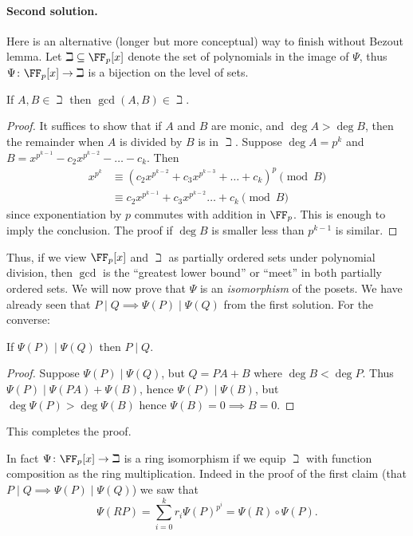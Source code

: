 \paragraph{Second solution.}
Here is an alternative (longer but more conceptual) way to finish without Bezout lemma.
Let $\beth \subseteq \FF_p[x]$ denote the set of polynomials in the image of $\Psi$,
thus $\Psi \colon \FF_p[x] \to \beth$ is a bijection on the level of sets.

\begin{claim*}
  If $A,B \in \beth$ then $\gcd(A,B) \in \beth$.
\end{claim*}
\begin{proof}
  It suffices to show that if $A$ and $B$ are monic,
  and $\deg A > \deg B$,
  then the remainder when $A$ is divided by $B$ is in $\beth$.
  Suppose $\deg A = p^k$ and $B = x^{p^{k-1}} - c_2x^{p^{k-2}} - \dots - c_k$.
  Then
  \begin{align*}
    x^{p^k} &\equiv \left( c_2x^{p^{k-2}} + c_3x^{p^{k-3}}
    + \dots + c_k  \right)^p \pmod B  \\
    &\equiv c_2x^{p^{k-1}} + c_3x^{p^{k-2}} \dots + c_k \pmod B
  \end{align*}
  since exponentiation by $p$ commutes with addition in $\FF_p$.
  This is enough to imply the conclusion.
  The proof if $\deg B$ is smaller less than $p^{k-1}$ is similar.
\end{proof}

Thus, if we view $\FF_p[x]$ and $\beth$ as partially ordered sets
under polynomial division, then $\gcd$ is the
``greatest lower bound'' or ``meet'' in both partially ordered sets.
We will now prove that $\Psi$ is an \emph{isomorphism} of the posets.
We have already seen that $P \mid Q \implies \Psi(P) \mid \Psi(Q)$
from the first solution. For the converse:

\begin{claim*}
  If $\Psi(P) \mid \Psi(Q)$ then $P \mid Q$.
\end{claim*}
\begin{proof}
  Suppose $\Psi(P) \mid \Psi(Q)$, but $Q=PA+B$ where $\deg B < \deg P$.
  Thus $\Psi(P) \mid \Psi(PA) + \Psi(B)$, hence $\Psi(P) \mid \Psi(B)$,
  but $\deg \Psi(P) > \deg \Psi(B)$ hence $\Psi(B) = 0 \implies B = 0$.
\end{proof}

This completes the proof.

\begin{remark*}
   In fact $\Psi \colon \FF_p[x] \to \beth$ is a ring isomorphism
   if we equip $\beth$ with function composition as the ring multiplication.
   Indeed in the proof of the first claim
   (that $P \mid Q \implies \Psi(P) \mid \Psi(Q)$) we saw that
   \[ \Psi(RP) = \sum_{i=0}^k r_i \Psi(P)^{p^i} = \Psi(R) \circ \Psi(P). \]
\end{remark*}
